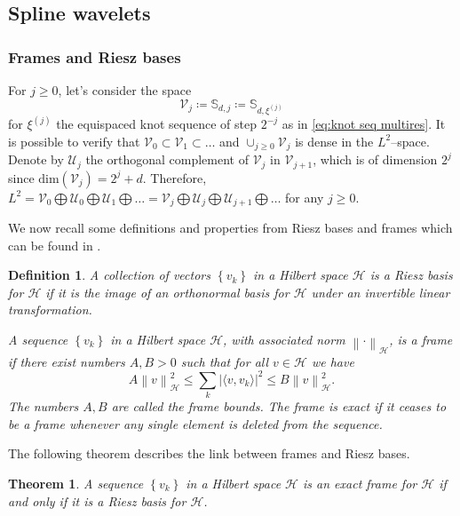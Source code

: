 \documentclass[preprint]{imsart}
\newcommand\norm[1]{\left\lVert#1\right\rVert}
\newtheorem{theorem}{Theorem}[section]
\newtheorem{definition}{Definition}
\numberwithin{equation}{section}
\begin{document}
\subsection{Spline wavelets}
\label{sec: splines wav}

\subsubsection{Frames and Riesz bases}

For $j\geq0$, let's consider the space 
\begin{equation}\label{eq: equi spline space}\mathcal{V}_j\coloneqq\mathbb{S}_{d,j}\coloneqq\mathbb{S}_{d,\xi^{(j)}}\end{equation}
for $\xi^{(j)}$ the equispaced knot sequence of step $2^{-j}$ as in \eqref{eq:knot seq multires}.
It is possible to verify that $\mathcal{V}_{0}\subset \mathcal{V}_{1}\subset\dots$ and $\cup_{j\geq 0}\mathcal{V}_j$ is dense in the $L^2$--space. Denote by $\mathcal{U}_j$ the orthogonal complement of $\mathcal{V}_j$ in $\mathcal{V}_{j+1}$, which is of dimension $2^j$ since $\text{dim}(\mathcal{V}_j)=2^j+d$. Therefore, $L^2=\mathcal{V}_0 \bigoplus \mathcal{U}_0 \bigoplus \mathcal{U}_1 \bigoplus \dots=\mathcal{V}_j \bigoplus \mathcal{U}_j \bigoplus \mathcal{U}_{j+1} \bigoplus \dots$ for any $j\geq 0$.

We now recall some definitions and properties from Riesz bases and frames which can be found in \cite{FramesRieszbases}.

\begin{definition}\label{def: riesz}
A collection of vectors $\left\{v_k\right\}$ in a Hilbert space $\mathcal{H}$ is a \textit{Riesz basis} for $\mathcal{H}$ if it is the image of an orthonormal basis for $\mathcal{H}$ under an invertible linear transformation.

A sequence $\left\{v_k\right\}$ in a Hilbert space $\mathcal{H}$, with associated norm $\norm{\cdot}_{\mathcal{H}}$, is a \textit{frame} if there exist numbers $A, B >0$ such that for all $v\in \mathcal{H}$ we have
\begin{equation}\label{eq: frame bounds def}
A\norm{v}_{\mathcal{H}}^2 \leq \sum_k |\langle v,v_k \rangle|^2\leq B\norm{v}_{\mathcal{H}}^2.
\end{equation}
The numbers $A,B$ are called the \textit{frame bounds}. The frame is
\textit{exact} if it ceases to be a frame whenever any single element is deleted from the sequence.
\end{definition}
The following theorem describes the link between frames and Riesz bases.
\begin{theorem}\label{th: riesz is frame}
    A sequence $\left\{v_k\right\}$ in a Hilbert space $\mathcal{H}$ is an exact frame for $\mathcal{H}$ if and only if it is a Riesz basis for $\mathcal{H}$.
\end{theorem}
\end{document}
